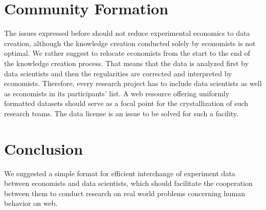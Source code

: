 \documentclass[conference]{IEEEtran}
\begin{document}
\section{Community Formation}
\indent The issues expressed before should not reduce experimental economics to data creation, although the knowledge creation conducted solely by economists is not optimal. We rather suggest to relocate economists from the start to the end of the knowledge creation process. That means that the data is analyzed first by data scientists and then the regularities are corrected and interpreted by economists. Therefore, every research project has to include data scientists as well as economists in its participants' list. A web resource offering uniformly formatted datasets should serve as a focal point for the crystallization of such research teams. The data license is an issue to be solved for such a facility.\\
\section{Conclusion}
\indent We suggested a simple format for efficient interchange of experiment data between economists and data scientists, which should facilitate the cooperation between them to conduct research on real world problems concerning human behavior on web.\\ 

\newpage

\end{document}
